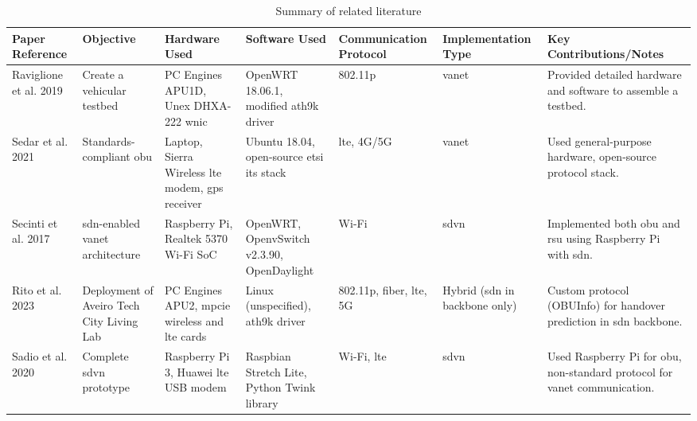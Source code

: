     \begin{table}[ht]
        \centering
        \begin{tabular}{|p{1.5cm}|p{1.7cm}|p{2cm}|p{1.6cm}|p{1.6cm}|p{1.8cm}|p{2.5cm}|}
        \hline
        \textbf{Paper Reference} & \textbf{Objective} & \textbf{Hardware Used} & \textbf{Software Used} & \textbf{Commu\-nication Protocol} & \textbf{Imple\-mentation Type} & \textbf{Key Contributions/Notes} \\ \hline
        
        Raviglione et al. 2019\cite{raviglione_open_2019} & Create a vehicular testbed & PC Engines APU1D, Unex DHXA-222 \gls{wnic} & OpenWRT 18.06.1, modified ath9k driver & 802.11p & \gls{vanet} & Provided detailed hardware and software to assemble a testbed. \\ \hline
        
        Sedar et al. 2021\cite{sedar_standards-compliant_2021} & Standards-compliant \gls{obu} & Laptop, Sierra Wireless \gls{lte} modem, \gls{gps} receiver & Ubuntu 18.04, open-source \gls{etsi} \gls{its} stack & \gls{lte}, 4G/5G & \gls{vanet} & Used general-purpose hardware, open-source protocol stack. \\ \hline
        
        Secinti et al. 2017\cite{secinti_software_2017} & \gls{sdn}-enabled \gls{vanet} architecture & Raspberry Pi, Realtek 5370 Wi-Fi SoC & OpenWRT, OpenvSwitch v2.3.90, OpenDaylight & Wi-Fi & \gls{sdvn} & Implemented both \gls{obu} and \gls{rsu} using Raspberry Pi with \gls{sdn}. \\ \hline
        
        Rito et al. 2023\cite{rito_aveiro_2023} & Deployment of Aveiro Tech City Living Lab & PC Engines APU2, \gls{mpcie} wireless and \gls{lte} cards & Linux (unspecified), ath9k driver & 802.11p, fiber, \gls{lte}, 5G & Hybrid (\gls{sdn} in backbone only) & Custom protocol (OBUInfo) for handover prediction in \gls{sdn} backbone. \\ \hline
        
        Sadio et al. 2020\cite{sadio_design_2020} & Complete \gls{sdvn} prototype & Raspberry Pi 3, Huawei \gls{lte} USB modem & Raspbian Stretch Lite, Python Twink library & Wi-Fi, \gls{lte} & \gls{sdvn} & Used Raspberry Pi for \gls{obu}, non-standard protocol for \gls{vanet} communication. \\ \hline
        
        \end{tabular}
        \caption{Summary of related literature}
    \end{table}
        